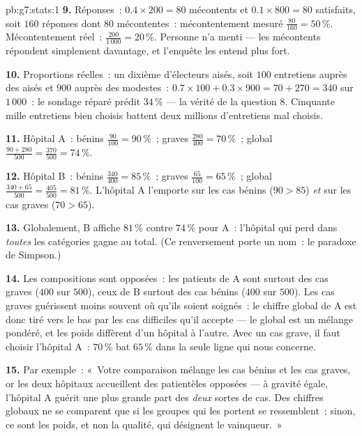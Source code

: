 \begin{solution}{pb:g7:stats:1}
\textbf{9.} Réponses~: $0.4 \times 200 = 80$ mécontents et
$0.1 \times 800 = 80$ satisfaits, soit $160$ réponses dont $80$
mécontentes~: mécontentement mesuré $\frac{80}{160} = 50\,\%$.
Mécontentement réel~: $\frac{200}{1\,000} = 20\,\%$. Personne n'a
menti --- les mécontents répondent simplement davantage, et
l'enquête les entend plus fort.

\textbf{10.} Proportions réelles~: un dixième d'électeurs aisés, soit
$100$ entretiens auprès des aisés et $900$ auprès des modestes~:
$0.7 \times 100 + 0.3 \times 900 = 70 + 270 = 340$ sur $1\,000$~: le
sondage réparé prédit $34\,\%$ --- la vérité de la question 8.
Cinquante mille entretiens bien choisis battent deux millions
d'entretiens mal choisis.

\textbf{11.} Hôpital A~: bénins $\frac{90}{100} = 90\,\%$~; graves
$\frac{280}{400} = 70\,\%$~; global
$\frac{90 + 280}{500} = \frac{370}{500} = 74\,\%$.

\textbf{12.} Hôpital B~: bénins $\frac{340}{400} = 85\,\%$~; graves
$\frac{65}{100} = 65\,\%$~; global
$\frac{340 + 65}{500} = \frac{405}{500} = 81\,\%$. L'hôpital A
l'emporte sur les cas bénins ($90 > 85$) \emph{et} sur les cas
graves ($70 > 65$).

\textbf{13.} Globalement, B affiche $81\,\%$ contre $74\,\%$ pour
A~: l'hôpital qui perd dans \emph{toutes} les catégories gagne au
total. (Ce renversement porte un nom~: le paradoxe de Simpson.)

\textbf{14.} Les compositions sont opposées~: les patients de A sont
surtout des cas graves ($400$ sur $500$), ceux de B surtout des cas
bénins ($400$ sur $500$). Les cas graves guérissent moins souvent où
qu'ils soient soignés~: le chiffre global de A est donc tiré vers le
bas par les cas difficiles qu'il accepte --- le global est un mélange
pondéré, et les poids diffèrent d'un hôpital à l'autre. Avec un cas
grave, il faut choisir l'hôpital A~: $70\,\%$ bat $65\,\%$ dans la
seule ligne qui nous concerne.

\textbf{15.} Par exemple~: «~Votre comparaison mélange les cas
bénins et les cas graves, or les deux hôpitaux accueillent des
patientèles opposées --- à gravité égale, l'hôpital A guérit une
plus grande part des \emph{deux} sortes de cas. Des chiffres
globaux ne se comparent que si les groupes qui les portent se
ressemblent~; sinon, ce sont les poids, et non la qualité, qui
désignent le vainqueur.~»
\end{solution}
